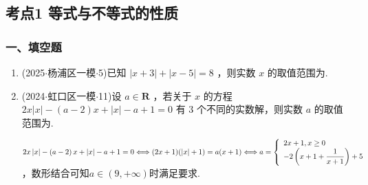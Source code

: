 \subsection*{考点1 等式与不等式的性质}

\subsubsection*{一、填空题}
\begin{enumerate}
    \item (2025$\cdot$杨浦区一模$\cdot$5)已知 $\left| {x + 3}\right|  + \left| {x - 5}\right|  = 8$ ，则实数 $x$ 的取值范围为.
    \item (2024$\cdot$虹口区一模$\cdot$11)设 $a \in  \mathbf{R}$ ，若关于 $x$ 的方程 ${2x}\left| x\right|  - \left( {a - 2}\right) x + \left| x\right|  - a + 1 = 0$ 有 3 个不同的实数解，则实数 $a$ 的取值范围为.
    \begin{jieda}
        ${2x}\left| x\right|  - \left( {a - 2}\right) x + \left| x\right|  - a + 1 = 0 \Longleftrightarrow (2x+1)(|x|+1) = a(x+1) \\
        \Longleftrightarrow a = \left\{\begin{array}{l}
            2x+1, x \geq 0 \\
            -2\left(x+1 + \dfrac{1}{x+1}\right)+5
        \end{array}\right.$，数形结合可知$a \in \left( {9, + \infty }\right)$时满足要求.
    \end{jieda}
\end{enumerate}

